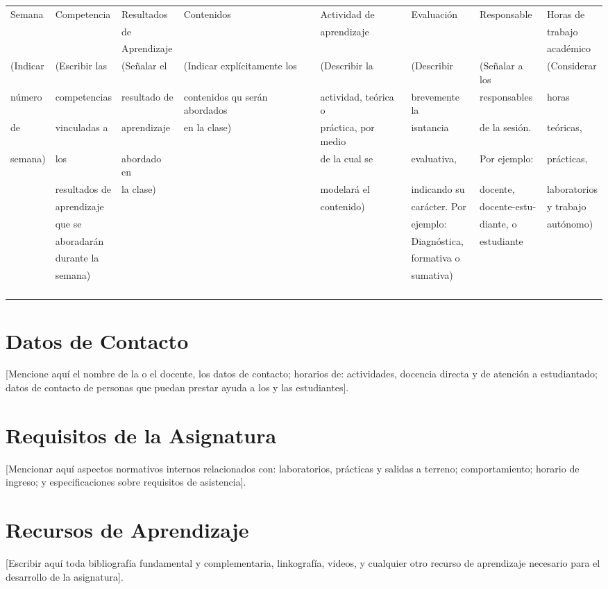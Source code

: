 \documentclass[11pt]{article}
\begin{document}
{\scriptsize
\begin{center}
\begin{tabular}{|l|l|l|l|l|l|l|l|}
\hline
Semana & Competencia & Resultados & Contenidos & Actividad de & Evaluación & Responsable & Horas de \\
 & & de & & aprendizaje & & & trabajo \\
 & & Aprendizaje & & & & & académico \\
\hline
(Indicar & (Escribir las & (Señalar el & (Indicar explícitamente los & (Describir la & (Describir & (Señalar a los & (Considerar \\
número & competencias & resultado de & contenidos qu serán abordados & actividad, teórica o & brevemente la & responsables & horas \\
de & vinculadas a & aprendizaje & en la clase) & práctica, por medio & isntancia & de la sesión. & teóricas, \\
semana) & los & abordado en & & de la cual se & evaluativa, & Por ejemplo: & prácticas, \\
 & resultados de & la clase) & & modelará el & indicando su & docente, & laboratorios \\
 & aprendizaje & & & contenido) & carácter. Por & docente-estu- & y trabajo \\
 & que se & & & & ejemplo: & diante, o & autónomo) \\
 & aboradarán & & & & Diagnóstica, & estudiante & \\
 & durante la & & & & formativa o & & \\
 & semana) & & & & sumativa) & & \\
 & & & & & & & \\
 & & & & & & & \\
\hline
 & & & & & & & \\
\hline
 & & & & & & & \\
\hline
\end{tabular}
\end{center}
}


\section{Datos de Contacto}
\label{sec:org6ba0b64}
[Mencione aquí el nombre de la o el docente, los datos de contacto; horarios de: actividades, docencia directa y de atención a estudiantado; datos de contacto de personas que puedan prestar ayuda a los y las estudiantes].

\section{Requisitos de la Asignatura}
\label{sec:orgcbdb8fc}
[Mencionar aquí aspectos normativos internos relacionados con: laboratorios, prácticas y salidas a terreno; comportamiento; horario de ingreso; y especificaciones sobre requisitos de asistencia].

\section{Recursos de Aprendizaje}
\label{sec:org3f19603}
[Escribir aquí toda bibliografía fundamental y complementaria, linkografía, videos, y cualquier otro recurso de aprendizaje necesario para el desarrollo de la asignatura]. 
\end{document}
